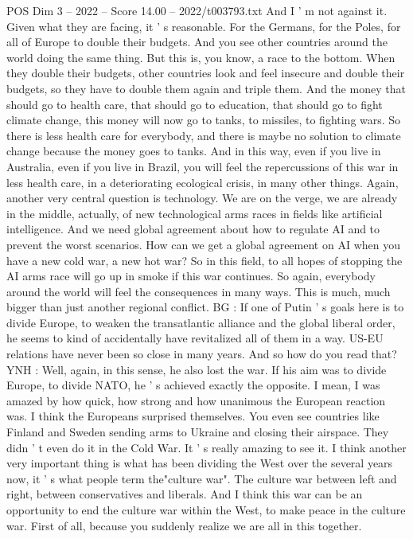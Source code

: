 \begin{textsample}{POS Dim 3 – 2022 – Score 14.00 – 2022/t003793.txt}
And I ' m not against it.
Given what they are facing, it ' s reasonable.
For the Germans, for the Poles, for all of Europe to double their budgets.
And you see other countries around the world doing the same thing.
But this is, you know, a race to the bottom.
When they double their budgets, other countries look and feel insecure and double their budgets, so they have to double them again and triple them.
And the money that should go to health care, that should go to education, that should go to fight climate change, this money will now go to tanks, to missiles, to fighting wars.
So there is less health care for everybody, and there is maybe no solution to climate change because the money goes to tanks.
And in this way, even if you live in Australia, even if you live in Brazil, you will feel the repercussions of this war in less health care, in a deteriorating ecological crisis, in many other things.
Again, another very central question is technology.
We are on the verge, we are already in the middle, actually, of new technological arms races in fields like artificial intelligence.
And we need global agreement about how to regulate AI and to prevent the worst scenarios.
How can we get a global agreement on AI when you have a new cold war, a new hot war?
So in this field, to all hopes of stopping the AI arms race will go up in smoke if this war continues.
So again, everybody around the world will feel the consequences in many ways.
This is much, much bigger than just another regional conflict.
BG : If one of Putin ' s goals here is to divide Europe, to weaken the transatlantic alliance and the global liberal order, he seems to kind of accidentally have revitalized all of them in a way.
US-EU relations have never been so close in many years.
And so how do you read that?
YNH : Well, again, in this sense, he also lost the war.
If his aim was to divide Europe, to divide NATO, he ' s achieved exactly the opposite.
I mean, I was amazed by how quick, how strong and how unanimous the European reaction was.
I think the Europeans surprised themselves.
You even see countries like Finland and Sweden sending arms to Ukraine and closing their airspace.
They didn ' t even do it in the Cold War.
It ' s really amazing to see it.
I think another very important thing is what has been dividing the West over the several years now, it ' s what people term the"culture war".
The culture war between left and right, between conservatives and liberals.
And I think this war can be an opportunity to end the culture war within the West, to make peace in the culture war.
First of all, because you suddenly realize we are all in this together.

\end{textsample}
